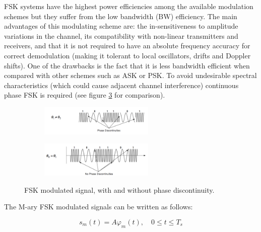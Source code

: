 \documentclass[12pt,a4paper,openright]{report}
\begin{document}
 FSK systems have the highest power efficiencies among the available modulation schemes but they suffer from the low bandwidth (BW) efficiency. The main advantages of this modulating scheme are: the in-sensitiveness to amplitude variations in the channel, its compatibility with non-linear transmitters and receivers, and that it is not required to have an absolute frequency accuracy for correct demodulation (making it tolerant to local oscillators, drifts and Doppler shifts). One of the drawbacks is the fact that it is less bandwidth efficient when compared with other schemes such as ASK or PSK. To avoid undesirable spectral characteristics (which could cause adjacent channel interference) continuous phase FSK is required (see figure \ref{fig:comparecpfsk} for comparison).
%
 \begin{figure}[H]
 \centering
	\begin{subfigure}[H]{0.9\textwidth}
 \centering
    \includegraphics[width=0.6\textwidth]{ncpfsk.pdf}
    \label{fig:FSKcoherent}

	\end{subfigure}
	\quad

	\begin{subfigure}[H]{0.9\textwidth}
 	\centering
    \includegraphics[width=0.6\textwidth]{cpfsk.pdf}
    \label{fig:FSKnoncoherent}
 	\end{subfigure}
    \caption[FSK modulated signal]{FSK modulated signal, with and without phase discontinuity\protect\cite{DigCommLec}.}
    \label{fig:comparecpfsk}
\end{figure}

The M-ary FSK modulated signals can be written as follows:

\begin{equation}\label{Eq:M-FSK symbol 2}
{s_m}(t) = A{\varphi _m}(t),\quad 0 \le t \le T_s
\end{equation}
\end{document}
